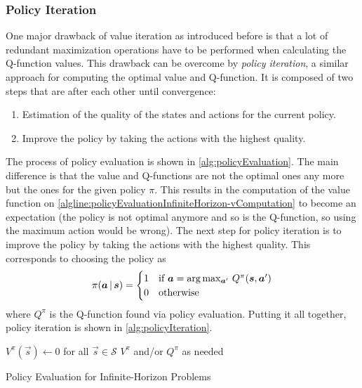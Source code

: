 			\subsubsection{Policy Iteration}
				One major drawback of value iteration as introduced before is that a lot of redundant maximization operations have to be performed when calculating the Q-function values. This drawback can be overcome by \emph{policy iteration}, a similar approach for computing the optimal value and Q-function. It is composed of two steps that are after each other until convergence:
				\begin{enumerate}
					\item {} Estimation of the quality of the states and actions for the current policy.
					\item {} Improve the policy by taking the actions with the highest quality.
				\end{enumerate}
				The process of policy evaluation is shown in \autoref{alg:policyEvaluation}. The main difference is that the value and Q-functions are not the optimal ones any more but the ones for the given policy \(\pi\). This results in the computation of the value function on \autoref{algline:policyEvaluationInfiniteHorizon-vComputation} to become an expectation (the policy is not optimal anymore and so is the Q-function, so using the maximum action would be wrong). The next step for policy iteration is to improve the policy by taking the actions with the highest quality. This corresponds to choosing the policy as
				\begin{equation*}
					\pi(\bm{a} \,\vert\, \bm{s}) =
						\begin{cases}
							1 & \text{if } \bm{a} = \arg\max_{\bm{a}'} \, Q^\pi(\bm{s}, \bm{a}') \\
							0 & \text{otherwise}
						\end{cases}
				\end{equation*}
				where \( Q^\pi \) is the Q-function found via policy evaluation. Putting it all together, policy iteration is shown in \autoref{alg:policyIteration}.

				\begin{algorithm}  \DontPrintSemicolon
					\( V^\pi(\vec{s}) \gets 0 \) for all \( \vec{s} \in \mathcal{S} \) \;
					\Return \( V^\pi \) and/or \( Q^\pi \) as needed \;

					\caption{Policy Evaluation for Infinite-Horizon Problems}
					\label{alg:policyEvaluation}
				\end{algorithm}


